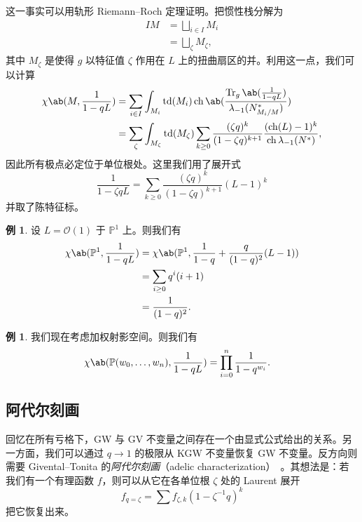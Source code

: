 \documentclass{amsart}
\theoremstyle{definition}
\newtheorem{exm}[thm]{例}
\theoremstyle{remark}
\theoremstyle{plain}
\theoremstyle{definition}
\theoremstyle{remark}
\renewcommand{\P}{\mathbb{P}}
\newcommand{\mc}[1]{\mathcal{#1}}
\newcommand{\on}[1]{\operatorname{#1}}
\newcommand{\1}{\mathbf{1}}
\newcommand{\2}{\mathbf{2}}
\newcommand{\3}{\mathbf{3}}
\DeclareMathOperator{\ch}{ch}
\begin{document}
这一事实可以用轨形 Riemann–Roch 定理证明。把惯性栈分解为
\begin{align*}
    IM &= \bigsqcup_{i \in I} M_i \\
    &= \bigsqcup_{\zeta} M_{\zeta},
\end{align*}
其中 \(M_{\zeta}\) 是使得 \(g\) 以特征值 \(\zeta\) 作用在 \(L\) 上的扭曲扇区的并。利用这一点，我们可以计算
\begin{align*}
    \chi\ab(M, \frac{1}{1-qL}) &= \sum_{i \in I} \int_{M_i} \on{td}(M_i) \on{ch} \ab(\frac{ \on{Tr}_g \ab(\frac{1}{1-qL}) }{\lambda_{-1}(N_{M_i/M}^*)}) \\
    &= \sum_{\zeta} \int_{M_{\zeta}} \on{td}(M_{\zeta}) \sum_{k \geq 0} \frac{(\zeta q)^k}{(1-\zeta q)^{k+1}} \frac{( \on{ch}(L)-1 )^k}{\ch \lambda_{-1}(N^*)},
\end{align*}
因此所有极点必定位于单位根处。这里我们用了展开式
\[ \frac{1}{1-\zeta q L} = \sum_{k \geq 0} \frac{(\zeta q)^k}{(1-\zeta q)^{k+1}} (L-1)^k \]
并取了陈特征标。

\begin{exm}
    设 \(L = \mc{O}(1)\) 于 \(\P^1\) 上。则我们有
    \begin{align*}
        \chi\ab(\P^1, \frac{1}{1-qL}) &= \chi\ab(\P^1, \frac{1}{1-q} + \frac{q}{(1-q)^2}(L-1)) \\
        &= \sum_{i \geq 0} q^i (i+1) \\
        &= \frac{1}{(1-q)^2}.
    \end{align*}
\end{exm}

\begin{exm}
    我们现在考虑加权射影空间。则我们有
    \begin{align*}
        \chi\ab(\P(w_0, \ldots, w_n), \frac{1}{1-qL}) &= \prod_{i=0}^n \frac{1}{1-q^{w_i}}. 
    \end{align*}
\end{exm}

\subsection{阿代尔刻画}%
\label{sub:Adelic characterization}

回忆在所有亏格下，GW 与 GV 不变量之间存在一个由显式公式给出的关系。另一方面，我们可以通过 \(q \to 1\) 的极限从 KGW 不变量恢复 GW 不变量。反方向则需要 Givental–Tonita 的\textit{阿代尔刻画}（adelic characterization）~\cite{GiventalTonita2014}。其想法是：若我们有一个有理函数 \(f\)，则可以从它在各单位根 \(\zeta\) 处的 Laurent 展开
\[ f_{q=\zeta} = \sum f_{\zeta, k} (1-\zeta^{-1} q)^k \]
把它恢复出来。
\end{document}
